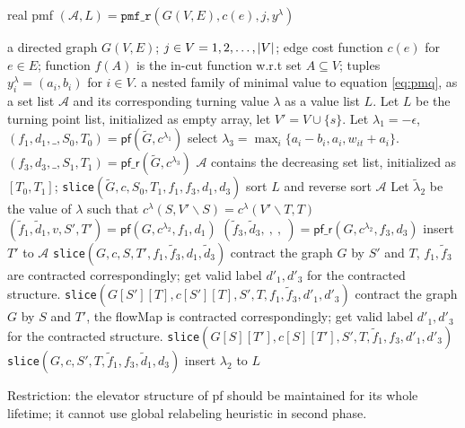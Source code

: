 \documentclass{article}
\begin{document}
\begin{algorithm}
\caption{real pmf $(\mathcal{A}, L) = \texttt{pmf\_r}(G(V,E), c(e), j, y^{\lambda})$}\label{alg:pmfRC}
\begin{algorithmic}[1]
\REQUIRE a directed graph $G(V, E)$; $j \in V={1,2,\dots, \lvert V\rvert}$; edge cost function $c(e)$ for $e \in E$; function $f(A)$ is the in-cut function w.r.t set $A\subseteq V$; tuples $y^{\lambda}_i = (a_i, b_i)$ for $i \in V$.
\ENSURE a nested family of minimal value to equation \eqref{eq:pmq}, as a set list $\mathcal{A}$ and its corresponding turning value $\lambda$ as a value list $L$.
\STATE Let $L$ be the turning point list, initialized as empty array, let $V'=V\cup\{s\}$.
\STATE Let $ \lambda_1  = -\epsilon$, $(f_1, d_1, \_, S_0, T_0) = \mathsf{pf}(\widetilde{G},c^{\lambda_1})$
\STATE select $\lambda_3 = \max_{i}\{a_i-b_i, a_i, w_{it} + a_i\}$. $(f_3, d_3, \_, S_1, T_1) = \mathsf{pf\_r}(\widetilde{G}, c^{\lambda_3})$\footnotemark 
\STATE $\mathcal{A}$ contains the decreasing set list, initialized as $[T_0, T_1]$;
\STATE \texttt{slice}$(\widetilde{G}, c, S_0, T_1, f_1, f_3, d_1, d_3)$
\STATE sort $L$ and reverse sort $\mathcal{A}$
\STATE Let $\tilde{\lambda}_2$ be the value of $\lambda$ such that $c^{\lambda}(S, V'\backslash S) = 
c^{\lambda}(V'\backslash T, T)$ 
\STATE $(\tilde{f}_1, \tilde{d}_1, v, S', T') = \textsf{pf}(G, c^{\lambda_2}, f_1, d_1)$
\STATE $(\tilde{f}_3, \tilde{d}_3, ~, ~, ~) = \textsf{pf\_r}(G, c^{\lambda_2}, f_3, d_3)$
\STATE insert $T'$ to $\mathcal{A}$
\STATE \texttt{slice}$(G, c, S, T', f_1, \tilde{f}_3, d_1, \tilde{d}_3)$
\STATE contract the graph $G$ by $S'$ and $T$, $f_1, \tilde{f}_3$ are contracted correspondingly; get valid label $d'_1, d'_3$ for the contracted structure.
\STATE \texttt{slice}$(G[S'][T], c[S'][T], S', T, f_1, \tilde{f}_3, d'_1, d'_3)$
\ELSE
\STATE contract the graph $G$ by $S$ and $T'$, the flowMap is contracted correspondingly; get valid label $d'_1, d'_3$ for the contracted structure.
\STATE \texttt{slice}$(G[S][T'], c[S][T'], S', T, \tilde{f}_1, f_3, d'_1, d'_3)$
\STATE \texttt{slice}$(G, c, S', T, \tilde{f}_1, f_3, \tilde{d}_1, d_3)$
\ENDIF
\ELSE
\STATE insert $\lambda_2$ to $L$
\ENDIF
\ENDFUNCTION
\end{algorithmic}
\end{algorithm}

Restriction: the elevator structure of pf should be maintained for its whole lifetime; it cannot use global relabeling heuristic in second phase.
\end{document}

